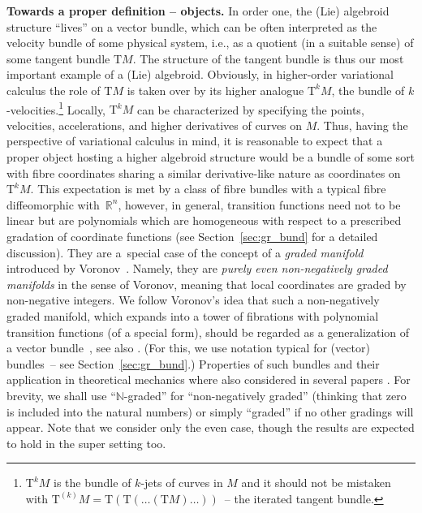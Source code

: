 \documentclass[10pt,a4paper]{amsart}
\newcommand{\R}{\mathbb{R}}
\newcommand{\N}{\mathbb{N}}
\newcommand{\T}{\mathrm{T}} %
\newcommand{\TT}[1]{\mathrm{T}^{#1}} %
\numberwithin{equation}{section}
\theoremstyle{definition}
\begin{document}
{\bf Towards a proper definition -- objects.} In order one, the (Lie) algebroid structure ``lives'' on a vector bundle, which can be often interpreted as the velocity bundle of some physical system, i.e., as a quotient (in a suitable sense) of some tangent bundle $\T M$. The structure of the tangent bundle is thus our most important example of a (Lie) algebroid. Obviously, in higher-order variational calculus the role of $\T M$ is taken over by its higher analogue $\TT{k} M$, the bundle of $k$-velocities.\footnote{$\T^k M$ is the bundle of $k$-jets of curves in $M$ and it should not be mistaken with $\T^{(k)} M = \T(\T(\ldots (\T M)\ldots))$~-- the iterated tangent bundle.} Locally, $\TT{k} M$ can be characterized by specifying the points, velocities, accelerations, and higher derivatives of curves on $M$. Thus, having the perspective of variational calculus in mind, it is reasonable to expect that a proper object hosting a higher algebroid structure would be a bundle of some sort with fibre coordinates sharing a similar derivative-like nature as coordinates on $\TT{k} M$. This expectation is met by a class of fibre bundles with a typical fibre diffeomorphic with~$\R^n$, however, in general, transition functions need not to be linear but are polynomials which are homogeneous with respect to a prescribed gradation of coordinate functions (see Section~\ref{sec:gr_bund} for a detailed discussion). They are a~special case of the concept of a \emph{graded manifold} introduced by Voronov~\cite{Voronov_2002}.
Namely, they are \emph{purely even non-negatively graded manifolds} in the sense of Voronov, meaning that local coordinates are graded by non-negative integers. We follow Voronov's idea that such a non-negatively graded manifold, which expands into a tower of fibrations with polynomial transition functions (of a special form), should be regarded as a generalization of a vector bundle~\cite{Voronov_2002}, see also \cite{Voronov_Q_mfds_high_lie_alg_2010, Voronov_2012_napl, Voronov_2012}. (For this, we use notation typical for (vector) bundles~-- see Section~\ref{sec:gr_bund}.)
Properties of such bundles and their application in theoretical mechanics where also considered in several papers \cite{BGG_2015,BGR, JG_MR_gr_bund_hgm_str_2011}. For brevity, we shall use ``$\N$-graded'' for ``non-negatively graded'' (thinking that zero is included into the natural numbers) or simply ``graded'' if no other gradings will appear. Note that we consider only the even case, though the results are expected to hold in the super setting too.
\end{document}
